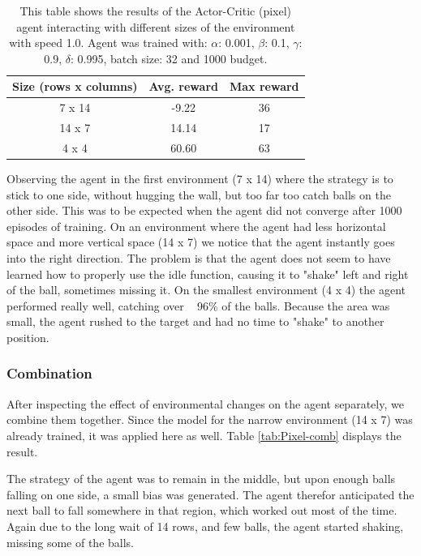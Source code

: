\documentclass{article}
\begin{document}
\begin{table}[]
    \centering
    \begin{tabular}{|c|c|c|}
        \hline
        \textbf{Size (rows x columns)} & \textbf{Avg. reward} & \textbf{Max reward} \\
        \hline
        7 x 14                & -9.22       & 36                  \\
        14 x 7                & 14.14       & 17                  \\
        4 x 4                 & 60.60       & 63                    \\
        \hline
    \end{tabular}
    \caption{This table shows the results of the Actor-Critic (pixel) agent interacting with different sizes of the environment with speed 1.0. 
    Agent was trained with: $\alpha$: 0.001, $\beta$: 0.1, $\gamma$: 0.9, $\delta$: 0.995, batch size: 32 and 1000 budget. }
    \label{tab:Pixel-size}
\end{table}

Observing the agent in the first environment (7 x 14)  where the strategy is to stick to one side, without hugging the wall, but too far too catch balls on the other side. 
This was to be expected when the agent did not converge after 1000 episodes of training. 
On an environment where the agent had less horizontal space and more vertical space (14 x 7) we notice that the agent instantly goes into the right direction.
The problem is that the agent does not seem to have learned how to properly use the idle function, causing it to "shake" left and right of the ball, sometimes missing it. 
On the smallest environment (4 x 4) the agent performed really well, catching over ~ 96\% of the balls.
Because the area was small, the agent rushed to the target and had no time to "shake" to another position.


\subsubsection{Combination}
After inspecting the effect of environmental changes on the agent separately, we combine them together. 
Since the model for the narrow environment (14 x 7) was already trained, it was applied here as well. 
Table \ref{tab:Pixel-comb} displays the result.

The strategy of the agent was to remain in the middle, but upon enough balls falling on one side, a small bias was generated. 
The agent therefor anticipated the next ball to fall somewhere in that region, which worked out most of the time.
Again due to the long wait of 14 rows, and few balls, the agent started shaking, missing some of the balls. 
\end{document}
